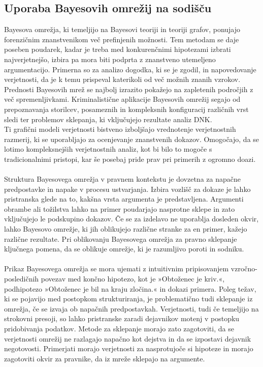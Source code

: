 \documentclass[12pt,a4paper]{amsart}
\theoremstyle{definition} %
\theoremstyle{plain} %
\begin{document}
\subsection{Uporaba Bayesovih omrežij na sodišču}
Bayesova omrežja, ki temeljijo na Bayesovi teoriji in teoriji grafov, ponujajo forenzičnim znanstvenikom več prefinjenih možnosti. Tem metodam
se daje poseben poudarek, kadar je treba med konkurenčnimi hipotezami izbrati najverjetnejšo, izbira pa mora biti podprta z znanstveno utemeljeno
argumentacijo. Primerna so za analizo dogodka, ki se je zgodil, in napovedovanje verjetnosti, da je k temu prispeval katerikoli od več možnih
znanih vzrokov. Prednosti Bayesovih mrež se najbolj izrazito pokažejo na zapletenih področjih z več spremenljivkami. Kriminalistične aplikacije
Bayesovih omrežij segajo od prepoznavanja storilcev, posameznih in kompleksnih konfiguracij različnih vrst sledi ter problemov sklepanja, ki
vključujejo rezultate analiz DNK.\\
Ti grafični modeli verjetnosti bistveno izboljšajo vrednotenje verjetnostnih razmerij, ki se uporabljajo za ocenjevanje znanstvenih dokazov.
Omogočajo, da se lotimo kompleksnejših verjetnostnih analiz, kot bi bilo to mogoče s tradicionalnimi pristopi, kar še posebaj pride prav pri primerih z ogromno doazi. \\\\
Struktura Bayesovega omrežja v pravnem kontekstu je dovzetna za napačne predpostavke in napake v procesu ustvarjanja. Izbira vozlišč za dokaze je lahko
pristranska glede na to, kakšna vrsta argumenta je predstavljena. Argumenti obrambe ali tožilstva lahko na primer poudarjajo nasprotne sklepe
in zato vključujejo le podskupino dokazov. Če se za izdelavo ne uporablja dosleden okvir, lahko Bayesovo omrežje, ki jih oblikujejo različne stranke za en
primer, kažejo različne rezultate. Pri oblikovanju Bayesovega omrežja za pravno sklepanje ključnega pomena, da se oblikuje omrežje, ki je razumljivo poroti
in sodniku.\\\\
Prikaz Bayesovega omrežja se mora ujemati z intuitivnim pripisovanjem vzročno-posledičnih povezav med končno hipotezo, kot je »Obtoženec je kriv.«, podhipotezo
»Obtoženec je bil na kraju zločina.« in dokazi primera. Poleg težav, ki se pojavijo med postopkom strukturiranja, je problematično tudi sklepanje
iz omrežja, če se izvaja ob napačnih predpostavkah. Verjetnosti, tudi če temeljijo na strokovni presoji, so lahko pristranske zaradi dejavnikov
motenj v postopku pridobivanja podatkov. Metode za sklepanje morajo zato zagotoviti, da se verjetnosti omrežij ne razlagajo napačno kot dejstva in
da se izpostavi dejavnik negotovosti. Primerjati morajo verjetnosti za nasprotujoče si hipoteze in morajo zagotoviti okvir za pravnike, da iz
mreže sklepajo na argumente.
\end{document}
